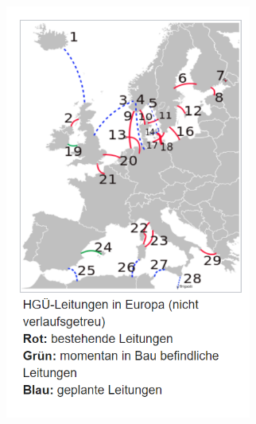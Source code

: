 \documentclass[aspectratio=1610, professionalfonts, 9pt]{beamer}
\begin{document}
{
\begin{frame}
\begin{columns}
\begin{column}{0.4\textwidth}
\begin{figure}
     \includegraphics[width=0.9\textwidth]{images/HGUeuropa.png}
 \end{figure}
\end{column}
\begin{column}{0.6\textwidth}
  \begin{figure}

\end{figure}
\end{column}
\end{columns}
\end{frame}}
\end{document}
